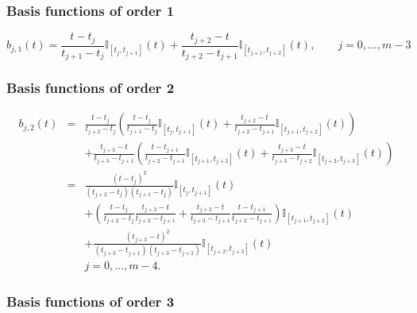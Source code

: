\documentclass {article}
\begin{document}
\subsubsection* {Basis functions of order 1}

\begin{equation}\label {eq:basis-1}
b_{j,1}(t) = \frac{t - t_j}{t_{j+1} - t_j} \mathbb{I}_{[t_j, t_{j+1}]}(t) + \frac{t_{j+2} - t}{t_{j+2} - t_{j+1}} \mathbb{I}_{[t_{j+1}, t_{j+2}]}(t) ,\qquad j=0,\ldots, m-3
\end{equation}

\subsubsection* {Basis functions of order 2}

\begin{eqnarray*}
b_{j,2}(t) &=& \frac{t - t_j}{t_{j+2} - t_j} \left(\frac{t - t_j}{t_{j+1} - t_j} \mathbb{I}_{[t_j, t_{j+1}]}(t) + \frac{t_{j+2} - t}{t_{j+2} - t_{j+1}} \mathbb{I}_{[t_{j+1}, t_{j+2}]}(t)\right)\\
&&+ \frac{t_{j+3} - t}{t_{j+3} - t_{j+1}}\left(\frac{t - t_{j+1}}{t_{j+2} - t_{j+1}} \mathbb{I}_{[t_{j+1}, t_{j+2}]}(t) + \frac{t_{j+3} - t}{t_{j+3} - t_{j+2}} \mathbb{I}_{[t_{j+2}, t_{j+3}]}(t)\right)\\
&=&\frac{(t - t_j)^2}{(t_{j+2} - t_j)(t_{j+1} - t_j)}\mathbb{I}_{[t_j, t_{j+1}]}(t) \\
&& + \left(\frac{t - t_j}{t_{j+2} - t_j}\frac{t_{j+2} - t}{t_{j+2} - t_{j+1}}+
\frac{t_{j+3} - t}{t_{j+3} - t_{j+1}}\frac{t - t_{j+1}}{t_{j+2} - t_{j+1}}\right)
\mathbb{I}_{[t_{j+1}, t_{j+2}]}(t) \\
&&+\frac{(t_{j+3} - t)^2}{(t_{j+3} - t_{j+1})(t_{j+3} - t_{j+2})} \mathbb{I}_{[t_{j+2}, t_{j+3}]}(t)\\
&& j=0,\ldots, m-4. 
\end{eqnarray*}

\subsubsection* {Basis functions of order 3}
\end{document}

